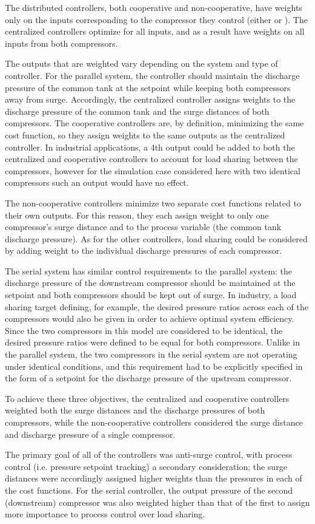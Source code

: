 The distributed controllers, both cooperative and non-cooperative, have weights only on the inputs corresponding to the compressor they control (either  or ).
The centralized controllers optimize for all inputs, and as a result have weights on all inputs from both compressors.

The outputs that are weighted vary depending on the system and type of controller.
For the parallel system, the controller should maintain the discharge pressure of the common tank at the setpoint while keeping both compressors away from surge.
Accordingly, the centralized controller assigns weights to the discharge pressure of the common tank and the surge distances of both compressors.
The cooperative controllers are, by definition, minimizing the same cost function, so they assign weights to the same outputs as the centralized controller.
In industrial applications, a 4th output could be added to both the centralized and cooperative controllers to account for load sharing between the compressors, however for the simulation case considered here with two identical compressors such an output would have no effect. 

The non-cooperative controllers minimize two separate cost functions related to their own outputs.
For this reason, they each assign weight to only one compressor's surge distance and to the process variable (the common tank discharge pressure).
As for the other controllers, load sharing could be considered by adding weight to the individual discharge pressures of each compressor. 

The serial system has similar control requirements to the parallel system: the discharge pressure of the downstream compressor should be maintained at the setpoint and both compressors should be kept out of surge.
In industry, a load sharing target defining, for example, the desired pressure ratios across each of the compressors would also be given in order to achieve optimal system efficiency.
Since the two compressors in this model are considered to be identical, the desired pressure ratios were defined to be equal for both compressors.
Unlike in the parallel system, the two compressors in the serial system are not operating under identical conditions, and this requirement had to be explicitly specified in the form of a setpoint for the discharge pressure of the upstream compressor.

To achieve these three objectives, the centralized and cooperative controllers weighted both the surge distances and the discharge pressures of both compressors, while the non-cooperative controllers considered the surge distance and discharge pressure of a single compressor.


The primary goal of all of the controllers was anti-surge control, with process control (i.e. pressure setpoint tracking) a secondary consideration; the surge distances were accordingly assigned higher weights than the pressures in each of the cost functions.
For the serial controller, the output pressure of the second (downstream) compressor was also weighted higher than that of the first to assign more importance to process control over load sharing.

